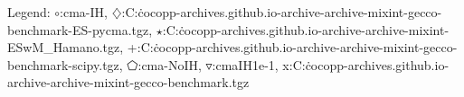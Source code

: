 Legend: {\color{CornflowerBlue}$\circ$}:cma-IH, {\color{Orange}$\diamondsuit$}:C:\Users\tristan\.cocopp\data-archives\numbbo.github.io\data-archive\data-archive\bbob-mixint-gecco-benchmark\CMA-ES-pycma.tgz, {\color{Green}$\star$}:C:\Users\tristan\.cocopp\data-archives\numbbo.github.io\data-archive\data-archive\bbob-mixint\CMA-ESwM\_Hamano.tgz, {\color{red}+}:C:\Users\tristan\.cocopp\data-archives\numbbo.github.io\data-archive\data-archive\bbob-mixint-gecco-benchmark\DE-scipy.tgz, {\color{magenta}$\pentagon$}:cma-NoIH, {\color{brown}$\triangledown$}:cmaIH1e-1, {{}x}:C:\Users\tristan\.cocopp\data-archives\numbbo.github.io\data-archive\data-archive\bbob-mixint-gecco-benchmark\RANDOMSEARCH.tgz